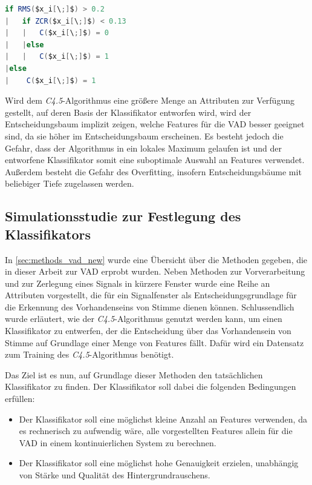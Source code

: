 \begin{lstlisting}[frame=single,mathescape=true,basicstyle=\footnotesize,language=Java,label=lst:tree01,caption=Beispiel eines Entscheidungsbaums für die Klassifizierung bei der VAD,linewidth=1\textwidth]
if RMS($x_i[\;]$) > 0.2
|   if ZCR($x_i[\;]$) < 0.13
|   |   C($x_i[\;]$) = 0
|   |else
|   |   C($x_i[\;]$) = 1
|else
|    C($x_i[\;]$) = 1
\end{lstlisting}

Wird dem \emph{C4.5}-Algorithmus eine größere Menge an Attributen zur Verfügung gestellt, auf deren Basis der Klassifikator entworfen wird, wird der Entscheidungsbaum implizit zeigen, welche Features für die VAD besser geeignet sind, da sie höher im Entscheidungsbaum erscheinen. Es besteht jedoch die Gefahr, dass der Algorithmus in ein lokales Maximum gelaufen ist und der entworfene Klassifikator somit eine suboptimale Auswahl an Features verwendet. Außerdem besteht die Gefahr des Overfitting, insofern Entscheidungsbäume mit beliebiger Tiefe zugelassen werden.

\subsection{Simulationsstudie zur Festlegung des Klassifikators}
\label{sec:vad_study}

In \autoref{sec:methods_vad_new} wurde eine Übersicht über die Methoden gegeben, die in dieser Arbeit zur VAD erprobt wurden. Neben Methoden zur Vorverarbeitung und zur Zerlegung eines Signals in kürzere Fenster wurde eine Reihe an Attributen vorgestellt, die für ein Signalfenster als Entscheidungsgrundlage für die Erkennung des Vorhandenseins von Stimme dienen können. Schlussendlich wurde erläutert, wie der \emph{C4.5}-Algorithmus genutzt werden kann, um einen Klassifikator zu entwerfen, der die Entscheidung über das Vorhandensein von Stimme auf Grundlage einer Menge von Features fällt. Dafür wird ein Datensatz zum Training des \emph{C4.5}-Algorithmus benötigt.

Das Ziel ist es nun, auf Grundlage dieser Methoden den tatsächlichen Klassifikator zu finden. Der Klassifikator soll dabei die folgenden Bedingungen erfüllen:

\begin{itemize}
\item Der Klassifikator soll eine möglichst kleine Anzahl an Features verwenden, da es rechnerisch zu aufwendig wäre, alle vorgestellten Features allein für die VAD in einem kontinuierlichen System zu berechnen.
\item Der Klassifikator soll eine möglichst hohe Genauigkeit erzielen, unabhängig von Stärke und Qualität des Hintergrundrauschens.
\end{itemize}

